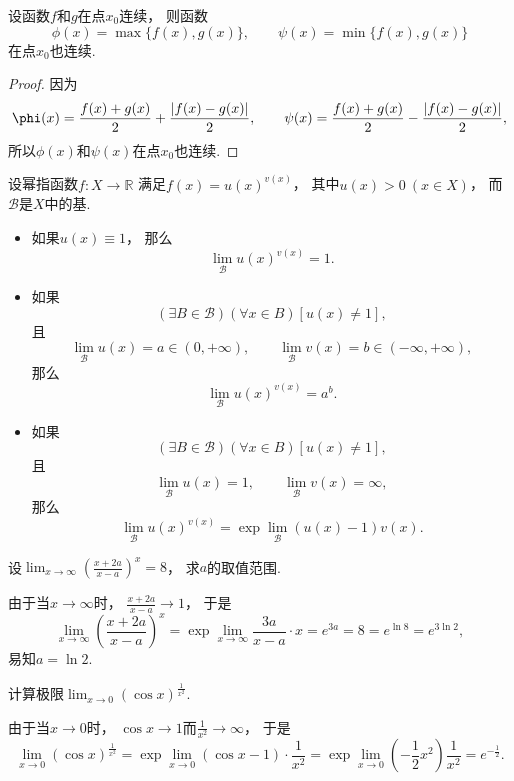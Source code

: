 \begin{proposition}
设函数\(f\)和\(g\)在点\(x_0\)连续，
则函数\[
	\phi(x) = \max\{f(x),g(x)\}, \qquad
	\psi(x) = \min\{f(x),g(x)\}
\]在点\(x_0\)也连续.
\begin{proof}
因为\[
	\phi(x)
	= \frac{f(x)+g(x)}{2}+\frac{\abs{f(x)-g(x)}}{2}, \qquad
	\psi(x)
	= \frac{f(x)+g(x)}{2}-\frac{\abs{f(x)-g(x)}}{2},
\]
所以\(\phi(x)\)和\(\psi(x)\)在点\(x_0\)也连续.
\end{proof}
\end{proposition}

\begin{proposition}\label{theorem:幂指函数.幂指函数的极限}
设幂指函数\(f\colon X\to\mathbb{R}\)
满足\(f(x) = u(x)^{v(x)}\)，
其中\(u(x)>0\ (x \in X)\)，
而\(\mathcal{B}\)是\(X\)中的基.
\begin{itemize}
	\item 如果\(u(x) \equiv 1\)，
	那么\[
		\lim_\mathcal{B} u(x)^{v(x)} = 1.
	\]

	\item 如果\[
		(\exists B\in\mathcal{B})
		(\forall x \in B)
		[u(x)\neq1],
	\]且\[
		\lim_\mathcal{B} u(x) = a \in (0,+\infty), \qquad
		\lim_\mathcal{B} v(x) = b \in (-\infty,+\infty),
	\]
	那么\[
		\lim_\mathcal{B} u(x)^{v(x)} = a^b.
	\]

	\item 如果\[
		(\exists B\in\mathcal{B})
		(\forall x \in B)
		[u(x)\neq1],
	\]且\[
		\lim_\mathcal{B} u(x) = 1, \qquad
		\lim_\mathcal{B} v(x) = \infty,
	\]
	那么\[
		\lim_\mathcal{B} u(x)^{v(x)}
		= \exp\lim_\mathcal{B} (u(x)-1) v(x).
	\]
\end{itemize}
\end{proposition}

\begin{example}
设\(\lim_{x\to\infty} \left( \frac{x+2a}{x-a} \right)^x = 8\)，
求\(a\)的取值范围.
\begin{solution}
由于当\(x\to\infty\)时，
\(\frac{x+2a}{x-a} \to 1\)，
于是\[
	\lim_{x\to\infty} \left( \frac{x+2a}{x-a} \right)^x
	= \exp\lim_{x\to\infty} \frac{3a}{x-a} \cdot x
	= e^{3a}
	= 8 = e^{\ln8} = e^{3\ln2},
\]
易知\(a = \ln2\).
\end{solution}
\end{example}

\begin{example}
计算极限\(\lim_{x\to0} (\cos x)^{\frac1{x^2}}\).
\begin{solution}
由于当\(x\to0\)时，
\(\cos x \to 1\)而\(\frac1{x^2} \to \infty\)，
于是\[
	\lim_{x\to0} (\cos x)^{\frac1{x^2}}
	= \exp\lim_{x\to0} (\cos x - 1) \cdot \frac1{x^2}
	= \exp\lim_{x\to0} \left( -\frac12 x^2 \right) \frac1{x^2}
	= e^{-\frac12}.
\]
\end{solution}
\end{example}

